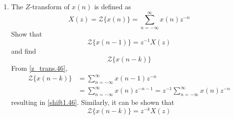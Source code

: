 \documentclass[journal,12pt,twocolumn]{IEEEtran}
\theoremstyle{remark}
\begin{document}
\begin{enumerate}[label=\thesection.\arabic*]
\item The $Z$-transform of $x(n)$ is defined as
%
\begin{equation}
\label{z_trans.46}
X(z)={\mathcal {Z}}\{x(n)\}=\sum _{n=-\infty }^{\infty }x(n)z^{-n}
\end{equation}
%
Show that
\begin{equation}
\label{shift1.46}
{\mathcal {Z}}\{x(n-1)\} = z^{-1}X(z)
\end{equation}
and find
\begin{equation}
	{\mathcal {Z}}\{x(n-k)\} 
\end{equation}
\solution From \eqref{z_trans.46},
\begin{align}
{\mathcal {Z}}\{x(n-k)\} &=\sum _{n=-\infty }^{\infty }x(n-1)z^{-n}
\\
&=\sum _{n=-\infty }^{\infty }x(n)z^{-n-1} = z^{-1}\sum _{n=-\infty }^{\infty }x(n)z^{-n}
\end{align}
resulting in \eqref{shift1.46}. Similarly, it can be shown that
%
\begin{equation}
\label{z_trans_shift.46}
	{\mathcal {Z}}\{x(n-k)\} = z^{-k}X(z)
\end{equation}


\end{enumerate}
\end{document}
